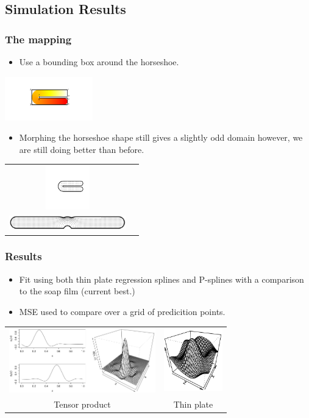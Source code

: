 \documentclass[ignorenonframetext]{beamer} %
\newcommand{\bc}{\begin{center}}
\newcommand{\ec}{\end{center}}
\newcommand{\bi}{\begin{itemize}}
\newcommand{\ei}{\end{itemize}}
\begin{document}
\subsection{Simulation Results}

\begin{frame}
	\frametitle{The mapping}
      \bi
         \item Use a bounding box around the horseshoe.
      \ei
      \bc
         \includegraphics[height=0.75in, trim=1in 1in 1in 0.75in]{figs/hswithboundingbox} 
      \ec
      \bi
         \item Morphing the horseshoe shape still gives a slightly odd domain however, we are still doing better than before.
      \ei
      \bc\begin{tabular}{@{}cc}
          \includegraphics[height=0.75in, trim=1in 1in 0in 0.75in]{figs/hsgridmapping-1} \\ \includegraphics[width=2in, trim=0in 0in 0in 0in]{figs/hsgridmapping-2} \\
       \end{tabular}\ec
\end{frame}

\begin{frame}
	\frametitle{Results}
       \bi
         \item Fit using both thin plate regression splines and P-splines with a comparison to the soap film (current best.) 
         \item MSE used to compare over a grid of predicition points.
        \ei
       \bc\begin{tabular}{@{}cc}
          \includegraphics[width=2.5in]{figs/tensorproduct} & \includegraphics[width=1in]{figs/tprs}\\
          Tensor product & Thin plate\\
       \end{tabular}\ec
\end{frame}
\end{document}
